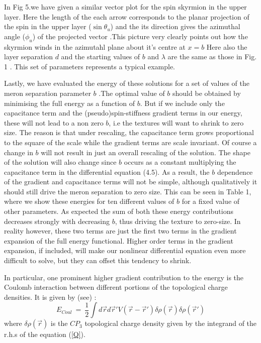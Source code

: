 In Fig 5.we have given a similar vector plot for the spin skyrmion
in the upper layer. 
Here the length of the each arrow corresponds to the planar
projection of the spin in the upper layer ($\sin \theta_u$) and the
its direction gives the azimuthal angle ($\phi_{u}$) of the projected vector
.This picture very clearly points out how the skyrmion winds in the
azimutahl plane about it's centre at $x = b$ 
Here also the layer separation $d$ and the starting values of $b$
and $\lambda$ are the same as those in Fig. 1 .
This set of parameters represents a typical example.

Lastly, we have evaluated the energy of these solutions for a
set of values of the meron separation parameter $b$ .The optimal value
of $b$ should be obtained by minimising the full energy as a function of $b$.
But if we include only the capacitance term and the (pseudo)spin-stiffness 
gradient terms in our energy, these will not lead to a non zero $b$, 
i.e the textures
will want to shrink to zero size. The reason is that under rescaling,
the capacitance term grows proportional to the square of the scale while
the gradient terms are scale invariant. Of course a change in $b$ will not 
result 
in just an overall rescaling of the solution. The shape of the solution 
will also change since $b$ occurs as a constant multiplying the 
capacitance term in the differential equation (4.5). As a result, 
the $b$ dependence of the gradient and capacitance terms will not be simple, 
although qualitatively it should still drive the meron separation to zero 
size. This can be seen in Table 1, where we show these energies for ten
different values of $b$ for a fixed value of other parameters. 
As expected the sum of both these energy contributions decreases 
strongly with decreasing $b$, thus driving the texture to zero-size. 
In reality however, these two terms are just the first two 
terms in the gradient expansion of the full energy 
functional. Higher order terms in the 
gradient expansion, if included, will make our nonlinear differential 
equation even more difficult to solve, but they can 
offset this tendency to shrink. 

In particular, one prominent higher gradient contribution to the energy is 
the Coulomb interaction between different portions of the topological 
charge densities. It is given by (see\cite{Arov}) :
\begin{equation} E_{Coul} \ = \ \frac{1}{2}\int d{\vec{r}}d{\vec{r}'}
V({\vec{r}}-{\vec{r}'})
\delta \rho({\vec{r}}) \delta \rho({\vec{r}'}) \label{3COL} \end{equation}
where $\delta \rho({\vec{r}})$ is the $CP_3$ topological charge
density given by the integrand of the r.h.s of the equation (\ref{Q}).

